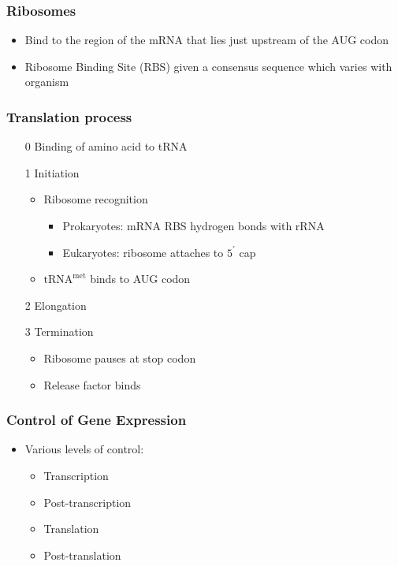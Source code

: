 \documentclass[a4paper]{article}
\begin{document}
\subsubsection{Ribosomes}

\begin{itemize}
  \item Bind to the region of the mRNA that lies just upstream of the AUG codon
  \item Ribosome Binding Site (RBS) given a consensus sequence which varies with
        organism
\end{itemize}

\subsubsection{Translation process}

\begin{enumerate}
  \item[0] Binding of amino acid to tRNA
  \item[1] Initiation
    \begin{itemize}
      \item Ribosome recognition
        \begin{itemize}
          \item Prokaryotes: mRNA RBS hydrogen bonds with rRNA
          \item Eukaryotes: ribosome attaches to $5^{\prime}$ cap
        \end{itemize}
      \item $\mathrm{tRNA}^{\mathrm{met}}$ binds to AUG codon
    \end{itemize}
  \item[2] Elongation
  \item[3] Termination
    \begin{itemize}
      \item Ribosome pauses at stop codon
      \item Release factor binds
    \end{itemize}
\end{enumerate}

\subsubsection{Control of Gene Expression}

\begin{itemize}
  \item Various levels of control:
    \begin{itemize}
      \item Transcription
      \item Post-transcription
      \item Translation
      \item Post-translation
    \end{itemize}
\end{itemize}
\end{document}
